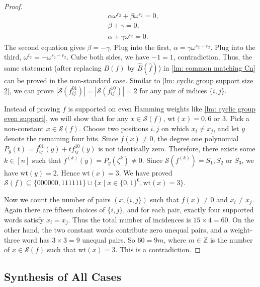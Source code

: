 \begin{proof}
\begin{equation*}
        \begin{aligned}
            &\alpha \omega^{r_2}+\beta \omega^{s_2}=0,\\
            & \beta+\gamma=0,\\
            &\alpha+\gamma \omega^{t_2}=0.
        \end{aligned}
    \end{equation*}
    The second equation gives $\beta=-\gamma$.
    Plug into the first, $\alpha=\gamma\omega^{s_2-r_2}.$
    Plug into the third, $\omega^{t_2}=-\omega^{s_2-r_2}.$
    Cube both sides, we have $-1=1$, contradiction.
    Thus, the same statement (after replacing $B(f)$ by $\widehat{B}(\widehat{f})$) in \cref{lm: common matching Cn} can be proved in the non-standard case.
    Similar to \cref{lm: cyclic group support size 2}, we can prove $|\mathscr{S}(f_{ij}^{01})|=|\mathscr{S}(f_{ij}^{10})|=2$ for any pair of indices $\{i,j\}.$

    Instead of proving $f$ is supported on even Hamming weights like \cref{lm: cyclic group even support}, we will show that for any $x\in \mathscr{S}(f)$, $\mathrm{wt}(x)=0,6$ or $3$.
    Pick a non-constant $x\in \mathscr{S}(f)$.
    Choose two positions \(i,j\) on which \(x_i\ne x_j\), and let \(y\) denote the remaining four bits.
    Since $f(x)\neq 0$, the degree one polynomial
    \(
    P_y(t)=f_{ij}^{01}(y)+tf_{ij}^{10}(y)
    \)
    is not identically zero.
    Therefore, there exists some $k\in[n]$ such that $f^{(k)}(y)=P_y(\zeta^k)\neq 0.$
    Since $\mathscr{S}(f^{(k)})=S_1,S_2$ or $S_3$, we have $\mathrm{wt}(y)=2.$
    Hence $\mathrm{wt}(x)=3.$
    We have proved $\mathscr{S}(f)\subseteq \{000000,111111\}\cup \{x\mid x\in \{0,1\}^6,\mathrm{wt}(x)=3\}$.

    Now we count the number of pairs $(x, \{i,j\})$ such that $f(x)\neq 0$ and $x_i\ne x_j$.
    Again there are fifteen choices of \(\{i,j\}\), and
    for each pair, exactly four supported words satisfy $x_i=x_j$.
    Thus the total number of incidences is
    $15\times4=60.$
    On the other hand, the two constant words contribute zero unequal pairs, and
    a weight-three word has $3\times 3=9$ unequal pairs.
    So $60=9m$, where $m\in \mathbb{Z}$ is the number of $x\in \mathscr{S}(f)$ such that $\mathrm{wt}(x)=3.$
    This is a contradiction.
\end{proof}

\subsection{Synthesis of All Cases}

